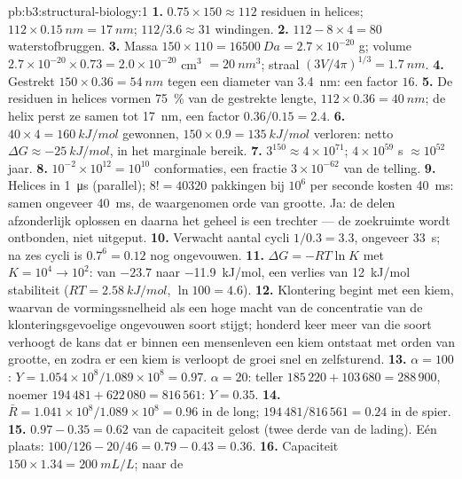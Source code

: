 \begin{solution}{pb:b3:structural-biology:1}
\textbf{1.} $0.75\times 150 \approx 112$ residuen in helices; $112\times
\qty{0.15}{nm} = \qty{17}{nm}$; $112/3.6 \approx 31$ windingen.
\textbf{2.} $112 - 8\times 4 = 80$ waterstofbruggen.
\textbf{3.} Massa $150\times 110 = \qty{16500}{Da} = 2.7\times 10^{-20}$
g; volume $2.7\times 10^{-20}\times 0.73 = 2.0\times 10^{-20}$ cm$^{3}$
$= \qty{20}{nm^3}$; straal $(3V/4\pi)^{1/3} = \qty{1.7}{nm}$.
\textbf{4.} Gestrekt $150\times 0.36 = \qty{54}{nm}$ tegen een diameter
van \qty{3.4}{nm}: een factor $16$.
\textbf{5.} De residuen in helices vormen \qty{75}{\%} van de gestrekte
lengte, $112\times 0.36 = \qty{40}{nm}$; de helix perst ze samen tot
\qty{17}{nm}, een factor $0.36/0.15 = 2.4$.
\textbf{6.} $40\times 4 = \qty{160}{kJ/mol}$ gewonnen, $150\times 0.9 =
\qty{135}{kJ/mol}$ verloren: netto $\Delta G \approx \qty{-25}{kJ/mol}$,
in het marginale bereik.
\textbf{7.} $3^{150} \approx 4\times 10^{71}$; $4\times 10^{59}$ s
$\approx 10^{52}$ jaar.
\textbf{8.} $10^{-2}\times 10^{12} = 10^{10}$ conformaties, een fractie
$3\times 10^{-62}$ van de telling.
\textbf{9.} Helices in \qty{1}{\micro s} (parallel); $8! = \num{40320}$
pakkingen bij $10^{6}$ per seconde kosten \qty{40}{ms}: samen ongeveer
\qty{40}{ms}, de waargenomen orde van grootte. Ja: de delen
afzonderlijk oplossen en daarna het geheel is een trechter --- de
zoekruimte wordt ontbonden, niet uitgeput.
\textbf{10.} Verwacht aantal cycli $1/0.3 = 3.3$, ongeveer \qty{33}{s};
na zes cycli is $0.7^{6} = 0.12$ nog ongevouwen.
\textbf{11.} $\Delta G = -RT\ln K$ met $K = 10^{4} \to 10^{2}$: van
$-23.7$ naar \qty{-11.9}{kJ/mol}, een verlies van \qty{12}{kJ/mol}
stabiliteit ($RT = \qty{2.58}{kJ/mol}$, $\ln 100 = 4.6$).
\textbf{12.} Klontering begint met een kiem, waarvan de vormingssnelheid
als een hoge macht van de concentratie van de klonteringsgevoelige
ongevouwen soort stijgt; honderd keer meer van die soort verhoogt de
kans dat er binnen een mensenleven een kiem ontstaat met orden van
grootte, en zodra er een kiem is verloopt de groei snel en
zelfsturend.
\textbf{13.} $\alpha = 100$: $Y = 1.054\times 10^{8}/1.089\times 10^{8} =
0.97$. $\alpha = 20$: teller $185\,220 + 103\,680 = 288\,900$,
noemer $194\,481 + 622\,080 = 816\,561$: $Y = 0.35$.
\textbf{14.} $\bar R = 1.041\times 10^{8}/1.089\times 10^{8} = 0.96$ in
de long; $194\,481/816\,561 = 0.24$ in de spier.
\textbf{15.} $0.97 - 0.35 = 0.62$ van de capaciteit gelost (twee derde
van de lading). Eén plaats: $100/126 - 20/46 = 0.79 - 0.43 = 0.36$.
\textbf{16.} Capaciteit $150\times 1.34 = \qty{200}{mL/L}$; naar de

\end{solution}
